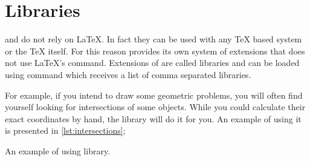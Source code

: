 \section{Libraries}

 and \TikZ{} do not rely on \LaTeX{}. In fact they can be used with
any \TeX{} based system or the \TeX{} itself. For this reason \TikZ{} provides
its own system of extensions that does not use \LaTeX{}'s 
command. Extensions of \TikZ{} are called libraries and can be loaded using
 command which receives a list of comma separated
libraries.

For example, if you intend to draw some geometric problems, you will often find
yourself looking for intersections of some objects. While you could calculate
their exact coordinates by hand, the  library will do it
for you. An example of using it is presented in \autoref{lst:intersections};
\begin{listing}
  \begin{example}[vertical_mode, examplewidth=0.8\linewidth]
\usetikzlibrary{intersections}

\end{example}
  \caption{An example of using 
    library.}\label{lst:intersections}
\end{listing}

